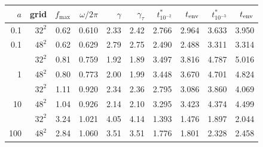 \begin{tabular}{rrrrrrrrrr}
\toprule
$a$ & grid & $f_{\max}$ & $\omega/2\pi$ & $\gamma$ & $\gamma_\tau$ & $t^*_{10^{-2}}$ & $t_{\rm env}$ & $t^*_{10^{-3}}$ & $t_{\rm env}$ \\
\midrule
0.1 & $32^2$ & 0.62 & 0.610 & 2.33 & 2.42 & 2.766 & 2.964 & 3.633 & 3.950 \\
0.1 & $48^2$ & 0.62 & 0.629 & 2.79 & 2.75 & 2.490 & 2.488 & 3.311 & 3.314 \\
\addlinespace
1 & $32^2$ & 0.81 & 0.759 & 1.92 & 1.89 & 3.497 & 3.816 & 4.787 & 5.016 \\
1 & $48^2$ & 0.80 & 0.773 & 2.00 & 1.99 & 3.448 & 3.670 & 4.701 & 4.824 \\
\addlinespace
10 & $32^2$ & 1.11 & 0.920 & 2.34 & 2.36 & 2.795 & 3.086 & 3.860 & 4.069 \\
10 & $48^2$ & 1.04 & 0.926 & 2.14 & 2.10 & 3.295 & 3.423 & 4.374 & 4.499 \\
\addlinespace
100 & $32^2$ & 3.24 & 1.021 & 4.05 & 4.14 & 1.393 & 1.476 & 1.897 & 2.044 \\
100 & $48^2$ & 2.84 & 1.060 & 3.51 & 3.51 & 1.776 & 1.801 & 2.328 & 2.458 \\
\bottomrule
\end{tabular}
